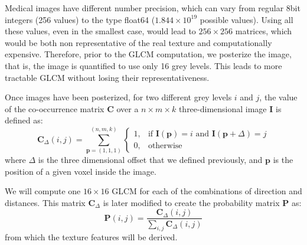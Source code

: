 Medical images have different number precision, which can vary from regular 8bit integers (256 values) to the type float64 ($1.844\times10^{19}$ possible values). Using all these values, even in the smallest case, would lead to $256\times 256$ matrices, which would be both non representative of the real texture and computationally expensive. Therefore, prior to the \ac{GLCM} computation, we posterize the image, that is, the image is quantified to use only 16 grey levels. This leads to more tractable \ac{GLCM} without losing their representativeness. 

Once images have been posterized, for two different grey levels $i$ and $j$, the value of the co-occurrence matrix $\mathbf{C}$ over a $n \times m \times k$ three-dimensional image $\mathbf{I}$ is defined as: 
\begin{equation}\label{eq:cooc3D}
\mathbf{C}_{\Delta}(i,j)=\sum_{\mathbf{p}=(1,1,1)}^{(n,m,k)}\begin{cases} 1, & \mbox{if }\mathbf{I}(\mathbf{p})=i\mbox{ and }\mathbf{I}(\mathbf{p}+\Delta)=j \\ 0, & \mbox{otherwise}\end{cases}
\end{equation}
where $\Delta$ is the three dimensional offset that we defined previously, and $\mathbf{p}$ is the position of a given voxel inside the image. 

We will compute one $16\times16$ \ac{GLCM} for each of the combinations of direction and distances. This matrix $\mathbf{C}_{\Delta}$ is later modified to create the probability matrix $\mathbf{P}$ as: 
\begin{equation}
\mathbf{P}(i,j) = \frac{\mathbf{C}_{\Delta}(i,j)}{\sum_{i,j}\mathbf{C}_{\Delta}(i,j)}
\end{equation}
from which the texture features will be derived.

